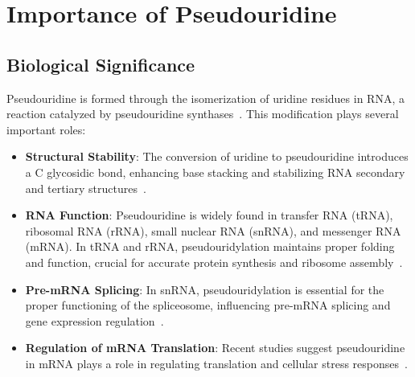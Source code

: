 \section{Importance of Pseudouridine}\label{sec:importance-of-pseudouridine}
  \subsection*{Biological Significance}
    Pseudouridine is formed through the isomerization of uridine residues in RNA, a reaction catalyzed by pseudouridine synthases~\cite{carlile_pseudouridine_2014}.
    This modification plays several important roles:

    \begin{itemize}
      \item \textbf{Structural Stability}: The conversion of uridine to pseudouridine introduces a C glycosidic bond, enhancing base stacking and stabilizing RNA secondary and tertiary structures~\cite{ge_rna_2013}.
      \item \textbf{RNA Function}: Pseudouridine is widely found in transfer RNA (tRNA), ribosomal RNA (rRNA), small nuclear RNA (snRNA), and messenger RNA (mRNA). In tRNA and rRNA, pseudouridylation maintains proper folding and function, crucial for accurate protein synthesis and ribosome assembly~\cite{schwartz_transcriptome-wide_2014}.
      \item \textbf{Pre-mRNA Splicing}: In snRNA, pseudouridylation is essential for the proper functioning of the spliceosome, influencing pre-mRNA splicing and gene expression regulation~\cite{karijolich_converting_2011}.
      \item \textbf{Regulation of mRNA Translation}: Recent studies suggest pseudouridine in mRNA plays a role in regulating translation and cellular stress responses~\cite{carlile_pseudouridine_2014}.
    \end{itemize}

